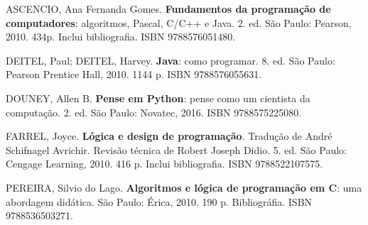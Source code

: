 \begin{pud}
\begin{bibcomplementar}
	\item ASCENCIO, Ana Fernanda Gomes. \textbf{Fundamentos da programação de computadores}: algoritmos, Pascal, C/C++ e Java. 2. ed. São Paulo: Pearson, 2010. 434p. Inclui bibliografia. ISBN 9788576051480.
	\item DEITEL, Paul; DEITEL, Harvey. \textbf{Java}: como programar. 8. ed. São Paulo: Pearson Prentice Hall, 2010. 1144 p. ISBN 9788576055631.
	\item DOUNEY, Allen B. \textbf{Pense em Python}: pense como um cientista da computação. 2. ed. São Paulo: Novatec, 2016. ISBN 9788575225080.
    	\item FARREL, Joyce. \textbf{Lógica e design de programação}. Tradução de André Schifnagel Avrichir. Revisão técnica de Robert Joseph Didio. 5. ed. São Paulo: Cengage Learning, 2010. 416 p. Inclui bibliografia. ISBN 9788522107575.
    	\item PEREIRA, Silvio do Lago. \textbf{Algoritmos e lógica de programação em C}: uma abordagem didática. São Paulo: Érica, 2010. 190 p. Bibliográfia. ISBN 9788536503271.
		
	\end{bibcomplementar}
\end{pud}


